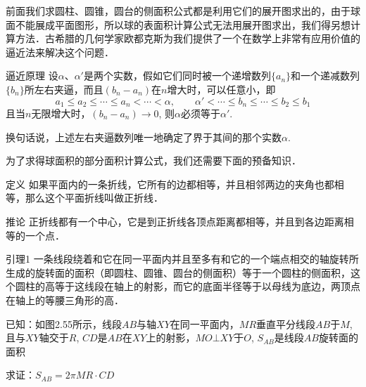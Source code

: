 前面我们求圆柱、圆锥，圆台的侧面积公式都是利用它们的展开图求出的，由于球面不能展成平面图形，所以球的表面积计算公式无法用展开图求出，我们得另想计算方法．古希腊的几何学家欧都克斯为我们提供了一个在数学上非常有应用价值的逼近法来解决这个问题．

\begin{blk}
 {逼近原理} 设$\alpha$、$\alpha'$是两个实数，假如它们同时被一个递增数列$\{a_n\}$和一个递减数列$\{b_n\}$所左右夹逼，而且$(b_n -a_n)$在$n$增大时，可以任意小，即
\[a_1\le a_2\le \cdots\le a_n<\cdots<\alpha,\qquad \alpha'<\cdots\le b_n\le \cdots\le b_2\le b_1\] 
 且当$n$无限增大时，$(b_n-a_n)\to 0$, 则$\alpha$必须等于$\alpha'$.   
\end{blk}

换句话说，上述左右夹逼数列唯一地确定了界于其间的那个实数$\alpha$.

为了求得球面积的部分面积计算公式，我们还需要下面的预备知识．

\begin{blk}
  {定义} 如果平面内的一条折线，它所有的边都相等，并且相邻两边的夹角也都相等，那么这个平面折线叫做正折线．
\end{blk}

\begin{blk}
   {推论} 正折线都有一个中心，它是到正折线各顶点距离都相等，并且到各边距离相等的一个点．   
\end{blk}


\begin{blk}
    {引理1} 一条线段绕着和它在同一平面内并且至多有和它的一个端点相交的轴旋转所生成的旋转面的面积（即圆柱、圆锥、圆台的侧面积）等于一个圆柱的侧面积，这个圆柱的高等于这线段在轴上的射影，而它的底面半径等于以母线为底边，两顶点在轴上的等腰三角形的高．
\end{blk}

已知：如图2.55所示，线段$AB$与轴$XY$在同一平面内，$MR$垂直平分线段$AB$于$M$, 且与$XY$轴交于$R$, $CD$是$AB$在$XY$上的射影，$MO\bot XY$于$O$, $S_{AB}$是线段$AB$旋转面的面积

求证：$S_{AB}=2\pi MR\cdot CD$

